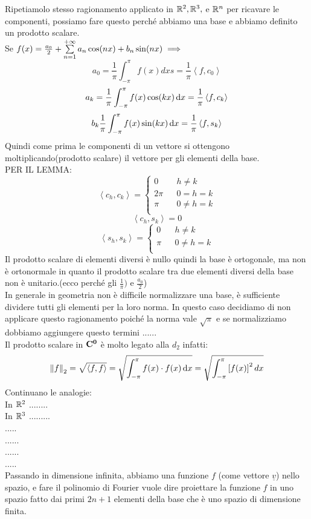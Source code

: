 Ripetiamolo stesso ragionamento applicato in $ \mathbb{R}^2, \mathbb{R}^3,$ e $ \mathbb{R}^n$ per ricavare le componenti, possiamo fare questo perché abbiamo una base e abbiamo definito un prodotto scalare.\\
Se $f(x)=\frac{a_0}{2}+\sum\limits_{n=1}^{+\infty}a_{n}\cos(nx)+b_{n}\sin(nx) \implies $
\[a_0=\frac{1}{\pi}\int_{-\pi}^{\pi}f(x)dxs=\frac{1}{\pi}\left<f,c_0\right> \]
\[a_k=\frac{1}{\pi}\int_{-\pi}^{\pi}f(x)\cos(kx)\,\mathrm{d}{x}=\frac{1}{\pi}\left<f,c_k\right> \]
\[b_k\frac{1}{\pi}\int_{-\pi}^{\pi}f(x)\sin(kx)\,\mathrm{d}{x}=\frac{1}{\pi}\left<f,s_k\right>\]
Quindi come prima le componenti di un vettore si ottengono moltiplicando(prodotto scalare) il vettore per gli elementi della base.\\
PER IL LEMMA:\\
\[
\left<c_h,c_k\right>=
\left\{\begin{matrix}
0&&h\ne k\\
2\pi&&0=h=k\\
\pi&&0\ne h=k\\
\end{matrix}\right.
\]
\[ \left<c_h,s_k\right>=0\]
\[
\left<s_h,s_k\right>=
\left\{\begin{matrix}
0&&h\ne k\\
\pi&&0\ne h=k\\
\end{matrix}\right.
\]
Il prodotto scalare di elementi diversi è nullo quindi la base è ortogonale, ma non è ortonormale in quanto il prodotto scalare tra due elementi diversi della base non è unitario.(ecco perché gli $\frac{1}{\pi})$ e $\frac{a_0}{2}$)\\
In generale in geometria non è difficile normalizzare una base, è sufficiente dividere tutti gli elementi per la loro norma. In questo caso decidiamo di non applicare questo ragionamento poiché la norma vale $\sqrt{\pi}$ e se normalizziamo dobbiamo aggiungere questo termini ......\\
Il prodotto scalare in $\mathbf{C^{0}}$ è molto legato alla $d_2$ infatti:
\[\left\|f\right\|_2=\sqrt{\left<f,f\right>}=\sqrt{\int_{-\pi}^{\pi}f(x)\cdot f(x)\,\mathrm{d}{x}} = \sqrt{\int_{-\pi}^{\pi}\left[f(x)\right]^2dx}\]
Continuano le analogie:\\
In $ \mathbb{R}^2$ ........\\
In $ \mathbb{R}^3$ .........\\
.....\\
......\\
......\\
.....\\
Passando in dimensione infinita, abbiamo una funzione $f$ (come vettore $\underline{v}$) nello spazio, e fare il polinomio di Fourier  vuole dire proiettare la funzione $f$ in uno spazio fatto dai primi $2n+1$ elementi della base che è uno spazio di dimensione finita.\\
